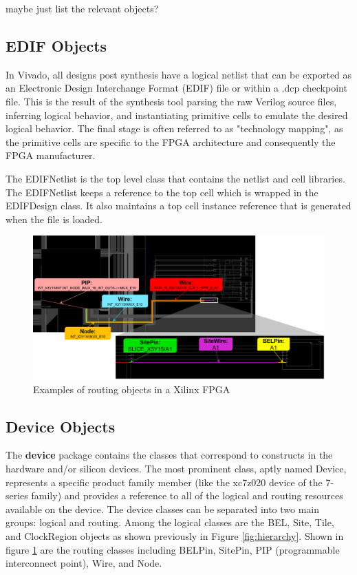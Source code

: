 \documentclass[twocolumn]{article}
\begin{document}
    maybe just list the relevant objects?

    \subsection{EDIF Objects}
    In Vivado, all designs post synthesis have a logical netlist that can be exported as an Electronic Design Interchange Format (EDIF) file or within a .dcp checkpoint file. 
    This is the result of the synthesis tool parsing the raw Verilog source files, inferring logical behavior, and instantiating primitive cells to emulate the desired logical behavior. 
    The final stage is often referred to as "technology mapping", as the primitive cells are specific to the FPGA architecture and consequently the FPGA manufacturer. 

    The EDIFNetlist is the top level class that contains the netlist and cell libraries. 
    The EDIFNetlist keeps a reference to the top cell which is wrapped in the EDIFDesign class. 
    It also maintains a top cell instance reference that is generated when the file is loaded. 

    \begin{figure}
        \centering
        \includegraphics[width=\textwidth]{figures/routing_objects.png}
        \caption{Examples of routing objects in a Xilinx FPGA}
        \label{fig:routing_objects}
    \end{figure}

    \subsection{Device Objects}
    The \textbf{device} package contains the classes that correspond to constructs in the hardware and/or silicon devices. 
    The most prominent class, aptly named Device, represents a specific product family member (like the xc7z020 device of the 7-series family) and provides a reference to all of the logical and routing resources available on the device. 
    The device classes can be separated into two main groups: logical and routing. 
    Among the logical classes are the BEL, Site, Tile, and ClockRegion objects as shown previously in Figure \ref{fig:hierarchy}. 
    Shown in figure \ref{fig:routing_objects} are the routing classes including BELPin, SitePin, PIP (programmable interconnect point), Wire, and Node. 
\end{document}
